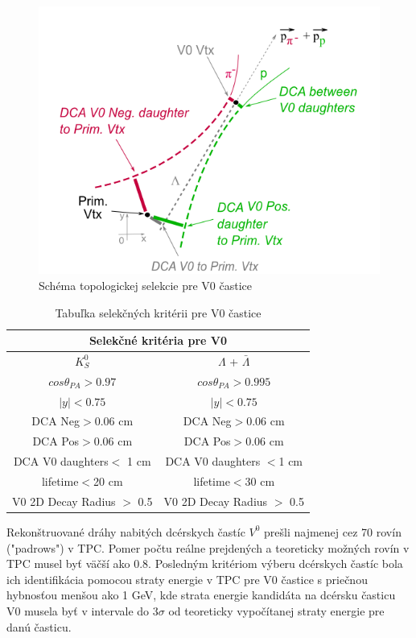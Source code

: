 \documentclass[thesismargins, thesislinespacing]{rnthesis}
\begin{document}
\begin{figure}[hbtp!]
	\centering
	\includegraphics[scale=0.9]{./Obrazky_praca/SchemaV0.png}
	\caption{Schéma topologickej selekcie pre V0 častice~\cite{schema}}
	\label{schema} 
\end{figure}

\begin{table}[hbtp!]
	\begin{center}
		\begin{tabular}{|c|c|}
			\hline
			 \multicolumn{2}{|c|}{Selekčné kritéria pre V0}  \\ \hline
			$K^0_S$ & $\Lambda$ + $\bar{\Lambda}$ \\ \hline
			$cos\theta_{PA} >0.97$ & $cos\theta_{PA} >0.995$  \\ \hline
			$|y|<0.75$ & $|y|<0.75$   \\ \hline
			DCA Neg$>$0.06 cm & DCA Neg$>$0.06 cm \\ \hline
			DCA Pos$>$0.06 cm & DCA Pos$>$0.06 cm \\ \hline
			DCA V0 daughters$<$ 1 cm & DCA V0 daughters $<$1 cm \\ \hline
			lifetime$<$20 cm & lifetime$<$30 cm \\ \hline
			V0 2D Decay Radius $>$ 0.5 & V0 2D Decay Radius $>$ 0.5\\ 
			\hline
		\end{tabular}
		\caption{Tabuľka selekčných kritérii pre V0 častice}
		\label{tabulka}
	\end{center}
\end{table}
\newpage
Rekonštruované dráhy nabitých dcérskych častíc $V^0$ prešli najmenej cez 70 rovín ("padrows") v TPC. Pomer počtu reálne prejdených a teoreticky možných rovín v TPC musel byť väčší ako 0.8. Posledným kritériom výberu dcérskych častíc bola ich identifikácia pomocou straty energie v TPC pre V0 častice s priečnou hybnosťou menšou ako 1 GeV, kde strata energie kandidáta na dcérsku časticu V0 musela byť v intervale do $3\sigma$ od teoreticky vypočítanej straty energie pre danú časticu.
\end{document}
